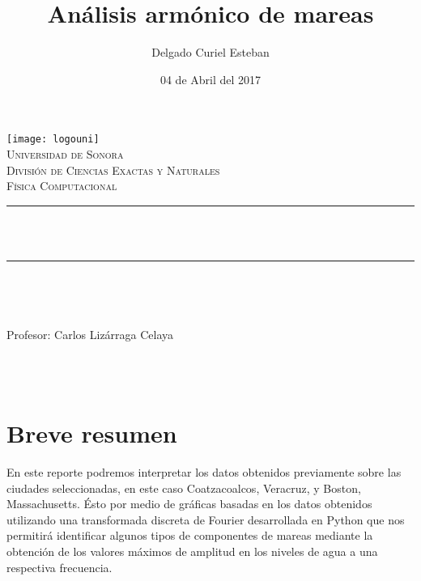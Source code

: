 \documentclass[12pt]{article}
\title{Análisis armónico de mareas}  %
\author{\centering Delgado Curiel Esteban}											%
\date{04 de Abril del 2017} %
\makeatletter
\let\thetitle\@title
\let\theauthor\@author
\let\thedate\@date
\makeatother
\begin{document}

\begin{titlepage}
	\begin{centering}
    
    \vspace*{0.5 cm}
    \texttt{[image: logouni]}\\[0.5 cm]	%
    \textsc{\Large Universidad de Sonora}\\[1.0 cm]	%
	\textsc{\Large División de Ciencias Exactas y Naturales}\\[0.5 cm]				%
	\textsc{\large Física Computacional}\\[0.5 cm]				%
	\rule{\linewidth}{0.2 mm} \\[0.4 cm]
	{ \huge \bfseries \thetitle}\\
	\rule{\linewidth}{0.2 mm} \\[0.5 cm]
	
	\begin{minipage}{\textwidth}
		\begin{flushleft} 
			\emph{\Large} \large \\
			\theauthor
			\end{flushleft}
	
		\begin{flushleft} 
			{Profesor:} \large \centering Carlos Lizárraga Celaya	
			\end{flushleft}
	\end{minipage}\\[1 cm]
	{\large \thedate}\\[2 cm]
 
	\vfill
    \end{centering}
    \end{titlepage}
    
\newpage
  \section{Breve resumen}
  
En este reporte podremos interpretar los datos obtenidos previamente sobre las ciudades seleccionadas, en este caso Coatzacoalcos, Veracruz, y Boston, Massachusetts. Ésto por medio de gráficas basadas en los datos obtenidos utilizando una transformada discreta de Fourier desarrollada en Python que nos permitirá identificar algunos tipos de componentes de mareas mediante la obtención de los valores máximos de amplitud en los niveles de agua a una respectiva frecuencia. 
\end{document}
